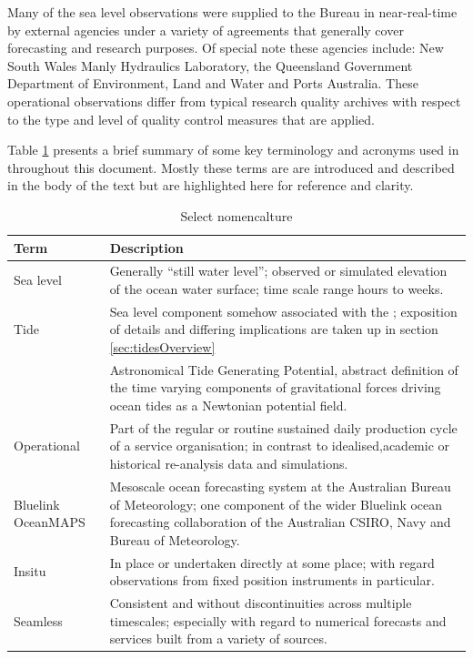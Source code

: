Many of the sea level observations were supplied to the Bureau in near-real-time by external agencies under a variety of agreements that generally cover forecasting and research purposes.   Of special note these agencies include: New South Wales Manly Hydraulics Laboratory, the Queensland Government Department of Environment, Land and Water and Ports Australia.
These operational observations differ from typical research quality archives with respect to the type and level of quality control measures that are applied. 

Table \ref{table:jargon} presents a brief summary of some key terminology and acronyms used in throughout this document.   Mostly these terms are are introduced and described in the body of the text but are highlighted here for reference and clarity.
\begin{table}[H]\centering
    \begin{tabular}{ |p{3cm}|p{11cm}| }
    \hline
    Term & Description  \\
    \hline
    Sea level & Generally ``still water level''; observed or simulated elevation of the ocean water surface; time scale range hours to weeks.\\
    \hline
    Tide & Sea level component somehow associated with the \ATGP{}; exposition of details and differing implications are taken up in section \ref{sec:tidesOverview}\\
    \hline
    \ATGP{} & Astronomical Tide Generating Potential, abstract definition of the time varying components of gravitational forces driving ocean tides as a Newtonian potential field.\\
    \hline
    Operational & Part of the regular or routine sustained daily production cycle of a service organisation;  in contrast to idealised,academic or historical re-analysis data and simulations.\\
    \hline
    Bluelink OceanMAPS & Mesoscale ocean forecasting system at the Australian Bureau of Meteorology; one component of the wider Bluelink ocean forecasting collaboration of the Australian CSIRO, Navy and Bureau of Meteorology.\\
    \hline
    Insitu & In place or undertaken directly at some place; with regard observations from fixed position instruments in particular. \\
    \hline
    Seamless &  Consistent and without discontinuities across multiple timescales; especially with regard to numerical forecasts and services built from a variety of sources. \\
    \hline
    \end{tabular}
    \caption{Select nomencalture}
    \label{table:jargon}
\end{table}



